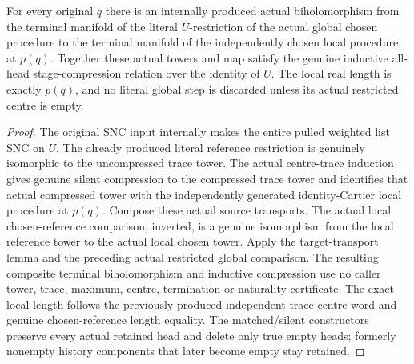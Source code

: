 \begin{theorem}
\label{hir:nc-ordered-choice-open-actual-all-head-compression}
\leanok
{}
For every original $q$ there is an internally produced actual biholomorphism from the terminal manifold of the literal $U$-restriction of the actual global chosen procedure to the terminal manifold of the independently chosen local procedure at $p(q)$. Together these actual towers and map satisfy the genuine inductive all-head stage-compression relation over the identity of $U$. The local real length is exactly $p(q)$, and no literal global step is discarded unless its actual restricted centre is empty.
\end{theorem}
\begin{proof}
The original SNC input internally makes the entire pulled weighted list SNC on $U$. The already produced literal reference restriction is genuinely isomorphic to the uncompressed trace tower. The actual centre-trace induction gives genuine silent compression to the compressed trace tower and identifies that actual compressed tower with the independently generated identity-Cartier local procedure at $p(q)$. Compose these actual source transports. The actual local chosen-reference comparison, inverted, is a genuine isomorphism from the local reference tower to the actual local chosen tower. Apply the target-transport lemma and the preceding actual restricted global comparison. The resulting composite terminal biholomorphism and inductive compression use no caller tower, trace, maximum, centre, termination or naturality certificate. The exact local length follows the previously produced independent trace-centre word and genuine chosen-reference length equality. The matched/silent constructors preserve every actual retained head and delete only true empty heads; formerly nonempty history components that later become empty stay retained.
\end{proof}

